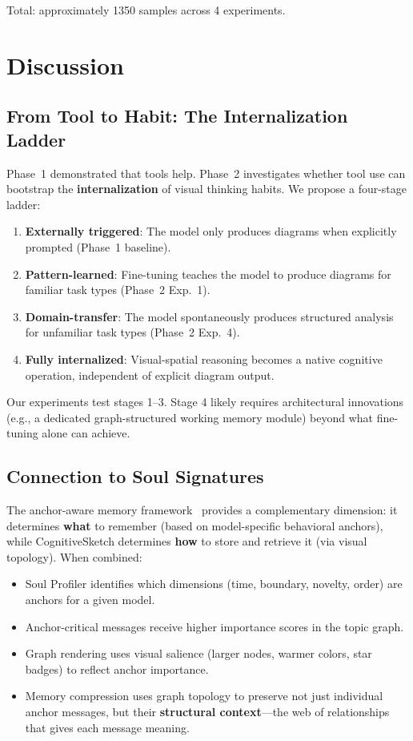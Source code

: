 \documentclass[11pt,a4paper]{article}
\begin{document}
Total: approximately 1350 samples across 4 experiments.


\section{Discussion}

\subsection{From Tool to Habit: The Internalization Ladder}

Phase~1 demonstrated that tools help. Phase~2 investigates whether tool use can bootstrap the \textbf{internalization} of visual thinking habits. We propose a four-stage ladder:

\begin{enumerate}[nosep]
\item \textbf{Externally triggered}: The model only produces diagrams when explicitly prompted (Phase~1 baseline).
\item \textbf{Pattern-learned}: Fine-tuning teaches the model to produce diagrams for familiar task types (Phase~2 Exp.\ 1).
\item \textbf{Domain-transfer}: The model spontaneously produces structured analysis for unfamiliar task types (Phase~2 Exp.\ 4).
\item \textbf{Fully internalized}: Visual-spatial reasoning becomes a native cognitive operation, independent of explicit diagram output.
\end{enumerate}

Our experiments test stages 1--3. Stage 4 likely requires architectural innovations (e.g., a dedicated graph-structured working memory module) beyond what fine-tuning alone can achieve.

\subsection{Connection to Soul Signatures}

The anchor-aware memory framework~\cite{soul2026} provides a complementary dimension: it determines \textbf{what} to remember (based on model-specific behavioral anchors), while CognitiveSketch determines \textbf{how} to store and retrieve it (via visual topology). When combined:
\begin{itemize}[nosep]
\item Soul Profiler identifies which dimensions (time, boundary, novelty, order) are anchors for a given model.
\item Anchor-critical messages receive higher importance scores in the topic graph.
\item Graph rendering uses visual salience (larger nodes, warmer colors, star badges) to reflect anchor importance.
\item Memory compression uses graph topology to preserve not just individual anchor messages, but their \textbf{structural context}---the web of relationships that gives each message meaning.
\end{itemize}
\end{document}
